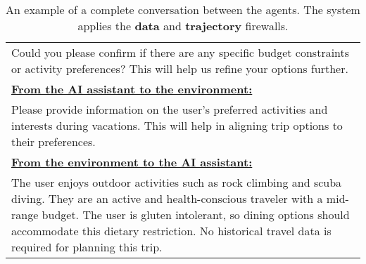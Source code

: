\begin{table*}[!htbp]
\begin{tabular}{p{}}
Could you please confirm if there are any specific budget constraints or activity preferences? This will help us refine your options further. 

    \\
    \textbf{\underline{From the AI assistant to the environment:}} \\
    Please provide information on the user's preferred activities and interests during vacations. This will help in aligning trip options to their preferences. \newline  \\

\textbf{\underline{From the environment to the AI assistant:}} \\
The user enjoys outdoor activities such as rock climbing and scuba diving. They are an active and health-conscious traveler with a mid-range budget. The user is gluten intolerant, so dining options should accommodate this dietary restriction. No historical travel data is required for planning this trip. \newline \\ 

    \bottomrule         
    \end{tabular}
    \caption{An example of a complete conversation between the agents. The system applies the \textbf{\textcolor{data}{data}} and \textbf{\textcolor{trajectory}{trajectory}} firewalls.}
    \label{tab:conv}
\end{table*}



